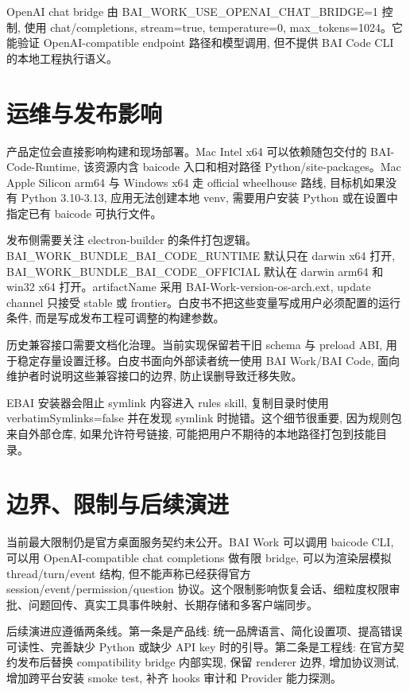 OpenAI chat bridge 由 BAI\_WORK\_USE\_OPENAI\_CHAT\_BRIDGE=1 控制, 使用 chat/completions, stream=true, temperature=0, max\_tokens=1024。它能验证 OpenAI-compatible endpoint 路径和模型调用, 但不提供 BAI Code CLI 的本地工程执行语义。

\section{运维与发布影响}
产品定位会直接影响构建和现场部署。Mac Intel x64 可以依赖随包交付的 BAI-Code-Runtime, 该资源内含 baicode 入口和相对路径 Python/site-packages。Mac Apple Silicon arm64 与 Windows x64 走 official wheelhouse 路线, 目标机如果没有 Python 3.10-3.13, 应用无法创建本地 venv, 需要用户安装 Python 或在设置中指定已有 baicode 可执行文件。

发布侧需要关注 electron-builder 的条件打包逻辑。BAI\_WORK\_BUNDLE\_BAI\_CODE\_RUNTIME 默认只在 darwin x64 打开, BAI\_WORK\_BUNDLE\_BAI\_CODE\_OFFICIAL 默认在 darwin arm64 和 win32 x64 打开。artifactName 采用 BAI-Work-{version}-{os}-{arch}.{ext}, update channel 只接受 stable 或 frontier。白皮书不把这些变量写成用户必须配置的运行条件, 而是写成发布工程可调整的构建参数。

历史兼容接口需要文档化治理。当前实现保留若干旧 schema 与 preload ABI, 用于稳定存量设置迁移。白皮书面向外部读者统一使用 BAI Work/BAI Code, 面向维护者时说明这些兼容接口的边界, 防止误删导致迁移失败。

EBAI 安装器会阻止 symlink 内容进入 rules skill, 复制目录时使用 verbatimSymlinks=false 并在发现 symlink 时抛错。这个细节很重要, 因为规则包来自外部仓库, 如果允许符号链接, 可能把用户不期待的本地路径打包到技能目录。

\section{边界、限制与后续演进}
当前最大限制仍是官方桌面服务契约未公开。BAI Work 可以调用 baicode CLI, 可以用 OpenAI-compatible chat completions 做有限 bridge, 可以为渲染层模拟 thread/turn/event 结构, 但不能声称已经获得官方 session/event/permission/question 协议。这个限制影响恢复会话、细粒度权限审批、问题回传、真实工具事件映射、长期存储和多客户端同步。

后续演进应遵循两条线。第一条是产品线: 统一品牌语言、简化设置项、提高错误可读性、完善缺少 Python 或缺少 API key 时的引导。第二条是工程线: 在官方契约发布后替换 compatibility bridge 内部实现, 保留 renderer 边界, 增加协议测试, 增加跨平台安装 smoke test, 补齐 hooks 审计和 Provider 能力探测。

